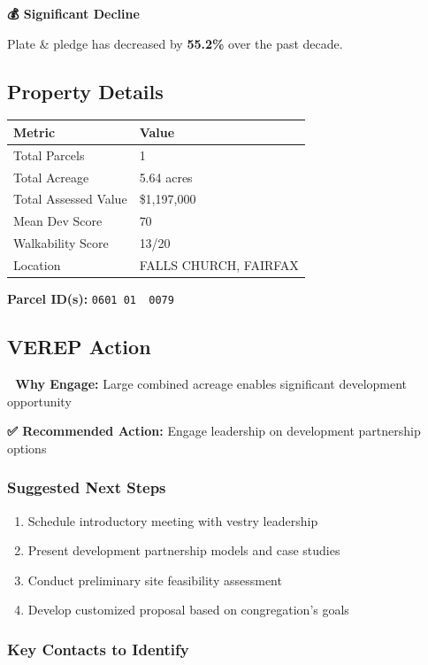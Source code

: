 \documentclass[
  letterpaper,
  DIV=11,
  numbers=noendperiod,
  oneside]{scrreprt}
\providecommand{\tightlist}{%
  \setlength{\itemsep}{0pt}\setlength{\parskip}{0pt}}
\begin{document}
\textbf{💰 Significant Decline}

Plate \& pledge has decreased by \textbf{55.2\%} over the past decade.

\subsection{Property Details}

\begin{longtable}[]{@{}ll@{}}
\toprule\noalign{}
Metric & Value \\
\midrule\noalign{}
\endhead
\bottomrule\noalign{}
\endlastfoot
Total Parcels & 1 \\
Total Acreage & 5.64 acres \\
Total Assessed Value & \$1,197,000 \\
Mean Dev Score & 70 \\
Walkability Score & 13/20 \\
Location & FALLS CHURCH, FAIRFAX \\
\end{longtable}

\textbf{Parcel ID(s):} \texttt{0601\ 01\ \ 0079}

\subsection{VEREP Action}

\textbf{🎯 Why Engage:} Large combined acreage enables significant
development opportunity

\textbf{✅ Recommended Action:} Engage leadership on development
partnership options

\subsubsection{Suggested Next Steps}\label{suggested-next-steps}

\begin{enumerate}
\def\labelenumi{\arabic{enumi}.}
\tightlist
\item
  Schedule introductory meeting with vestry leadership
\item
  Present development partnership models and case studies
\item
  Conduct preliminary site feasibility assessment
\item
  Develop customized proposal based on congregation's goals
\end{enumerate}

\subsubsection{Key Contacts to Identify}\label{key-contacts-to-identify}
\end{document}
